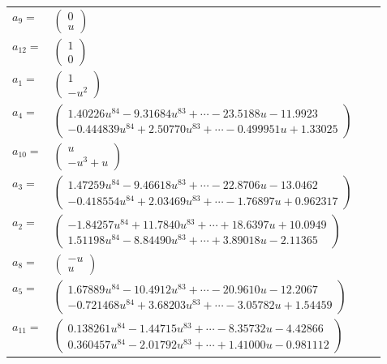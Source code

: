 \documentclass[1p]{elsarticle_modified}
\theoremstyle{definition}
\begin{document}
\begin{tabular}{m{7pt} m{180pt} m{7pt} m{180pt} }
\flushright $a_{9}=$&$\begin{pmatrix}0\\u\end{pmatrix}$ \\
\flushright $a_{12}=$&$\begin{pmatrix}1\\0\end{pmatrix}$ \\
\flushright $a_{1}=$&$\begin{pmatrix}1\\- u^2\end{pmatrix}$ \\
\flushright $a_{4}=$&$\begin{pmatrix}1.40226 u^{84}-9.31684 u^{83}+\cdots-23.5188 u-11.9923\\-0.444839 u^{84}+2.50770 u^{83}+\cdots-0.499951 u+1.33025\end{pmatrix}$ \\
\flushright $a_{10}=$&$\begin{pmatrix}u\\- u^3+u\end{pmatrix}$ \\
\flushright $a_{3}=$&$\begin{pmatrix}1.47259 u^{84}-9.46618 u^{83}+\cdots-22.8706 u-13.0462\\-0.418554 u^{84}+2.03469 u^{83}+\cdots-1.76897 u+0.962317\end{pmatrix}$ \\
\flushright $a_{2}=$&$\begin{pmatrix}-1.84257 u^{84}+11.7840 u^{83}+\cdots+18.6397 u+10.0949\\1.51198 u^{84}-8.84490 u^{83}+\cdots+3.89018 u-2.11365\end{pmatrix}$ \\
\flushright $a_{8}=$&$\begin{pmatrix}- u\\u\end{pmatrix}$ \\
\flushright $a_{5}=$&$\begin{pmatrix}1.67889 u^{84}-10.4912 u^{83}+\cdots-20.9610 u-12.2067\\-0.721468 u^{84}+3.68203 u^{83}+\cdots-3.05782 u+1.54459\end{pmatrix}$ \\
\flushright $a_{11}=$&$\begin{pmatrix}0.138261 u^{84}-1.44715 u^{83}+\cdots-8.35732 u-4.42866\\0.360457 u^{84}-2.01792 u^{83}+\cdots+1.41000 u-0.981112\end{pmatrix}$ \\

\end{tabular}
\end{document}
